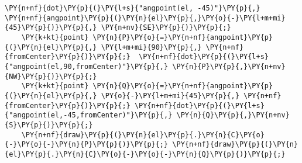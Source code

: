 \begin{Verbatim}[commandchars=\\\{\}]
    \PY{n+nf}{dot}\PY{p}{(}\PY{l+s}{"angpoint(el, -45)"}\PY{p}{,} \PY{n+nf}{angpoint}\PY{p}{(}\PY{n}{el}\PY{p}{,}\PY{o}{-}\PY{l+m+mi}{45}\PY{p}{)}\PY{p}{,} \PY{n+nv}{SE}\PY{p}{)}\PY{p}{;}
    \PY{k+kt}{point} \PY{n}{P}\PY{o}{=}\PY{n+nf}{angpoint}\PY{p}{(}\PY{n}{el}\PY{p}{,} \PY{l+m+mi}{90}\PY{p}{,} \PY{n+nf}{fromCenter}\PY{p}{)}\PY{p}{;}  \PY{n+nf}{dot}\PY{p}{(}\PY{l+s}{"angpoint(el,90,fromCenter)"}\PY{p}{,} \PY{n}{P}\PY{p}{,}\PY{n+nv}{NW}\PY{p}{)}\PY{p}{;}
    \PY{k+kt}{point} \PY{n}{Q}\PY{o}{=}\PY{n+nf}{angpoint}\PY{p}{(}\PY{n}{el}\PY{p}{,} \PY{o}{-}\PY{l+m+mi}{45}\PY{p}{,} \PY{n+nf}{fromCenter}\PY{p}{)}\PY{p}{;} \PY{n+nf}{dot}\PY{p}{(}\PY{l+s}{"angpoint(el,-45,fromCenter)"}\PY{p}{,} \PY{n}{Q}\PY{p}{,}\PY{n+nv}{S}\PY{p}{)}\PY{p}{;}
    \PY{n+nf}{draw}\PY{p}{(}\PY{n}{el}\PY{p}{.}\PY{n}{C}\PY{o}{-}\PY{o}{-}\PY{n}{P}\PY{p}{)}\PY{p}{;} \PY{n+nf}{draw}\PY{p}{(}\PY{n}{el}\PY{p}{.}\PY{n}{C}\PY{o}{-}\PY{o}{-}\PY{n}{Q}\PY{p}{)}\PY{p}{;}
\end{Verbatim}
